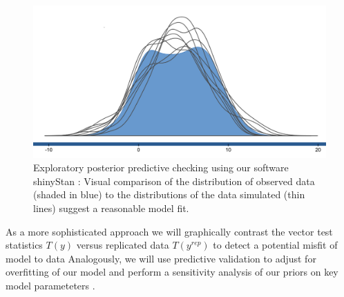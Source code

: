 \documentclass[11pt,notitlepage]{article}
\begin{document}
\begin{figure} 
 \vspace{-15pt}
 \includegraphics[scale=0.2]{Figures/posteriorpredictivecheck.png} 
  \caption{\footnotesize Exploratory posterior predictive checking using our software shinyStan \cite{shinystan-software:2015}: Visual comparison of the distribution of observed data (shaded in blue) to the distributions of the data simulated (thin lines) suggest a reasonable model fit.}
  \label{fig:posteriorpredictivecheck}
\end{figure}

As a more sophisticated approach we will graphically contrast the vector test statistics $T(y)$ versus replicated data $T(y^{rep})$ to detect a potential misfit of model to data \cite{Gelman2004posteriorpredictivechecks,Buja1999inference} Analogously, we will use predictive validation to adjust for overfitting of our model and perform a sensitivity analysis of our priors on key model parameteters \cite{Gelman-Hill_2014,Gelman_predictive_2000}.
\end{document}
